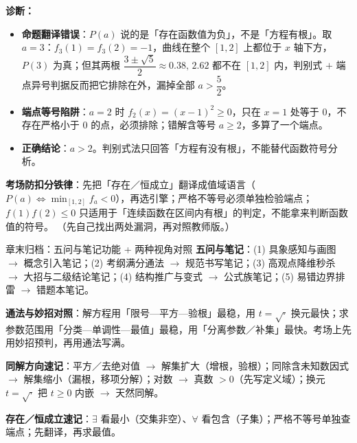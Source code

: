 \begin{tcolorbox}
\begin{enumerate}[label=(\arabic*), itemsep=4pt]
\ifteacher
{\bfseries\color{main}诊断：}
\begin{itemize}[itemsep=1pt]
\item \textbf{命题翻译错误}：$P(a)$ 说的是「存在函数值为负」，不是「方程有根」。取 $a=3$：$f_3(1)=f_3(2)=-1$，曲线在整个 $[1,2]$ 上都位于 $x$ 轴下方，$P(3)$ 为真；但其两根 $\dfrac{3\pm\sqrt5}{2}\approx0.38,\,2.62$ 都不在 $[1,2]$ 内，判别式 $+$ 端点异号判据反而把它排除在外，漏掉全部 $a>\dfrac52$。
\item \textbf{端点等号陷阱}：$a=2$ 时 $f_2(x)=(x-1)^2\ge0$，只在 $x=1$ 处等于 $0$，不存在严格小于 $0$ 的点，必须排除；错解含等号 $a\ge2$，多算了一个端点。
\item \textbf{正确结论}：$a>2$。判别式法只回答「方程有没有根」，不能替代函数符号分析。
\end{itemize}

\textbf{考场防扣分铁律}：先把「存在／恒成立」翻译成值域语言（$P(a)\iff\min_{[1,2]}f_a<0$），再选引擎；严格不等号必须单独检验端点；$f(1)f(2)\le0$ 只适用于「连续函数在区间内有根」的判定，不能拿来判断函数值的符号。
\else
{\small（先自己找出两处漏洞，再对照教师版。）}
\fi
\end{enumerate}
\end{tcolorbox}


\begin{notezone}{章末归档：五问与笔记功能 + 两种视角对照}
\textbf{五问与笔记}：(1) 具象感知与画图 $\to$ 概念引入笔记；(2) 考纲满分通法 $\to$ 规范书写笔记；(3) 高观点降维秒杀 $\to$ 大招与二级结论笔记；(4) 结构推广与变式 $\to$ 公式族笔记；(5) 易错边界排雷 $\to$ 错题本笔记。

\textbf{通法与妙招对照}：解方程用「限号—平方—验根」最稳，用 $t=\sqrt{\cdot}$ 换元最快；求参数范围用「分类—单调性—最值」最稳，用「分离参数／补集」最快。考场上先用妙招预判，再用通法写满。

\textbf{同解方向速记}：平方／去绝对值 $\to$ 解集扩大（增根，验根）；同除含未知数因式 $\to$ 解集缩小（漏根，移项分解）；对数 $\to$ 真数 $>0$（先写定义域）；换元 $t=\sqrt{\cdot}$ 把 $t\ge0$ 内嵌 $\to$ 天然同解。

\textbf{存在／恒成立速记}：$\exists$ 看最小（交集非空）、$\forall$ 看包含（子集）；严格不等号单独查端点；先翻译，再求最值。
\end{notezone}

